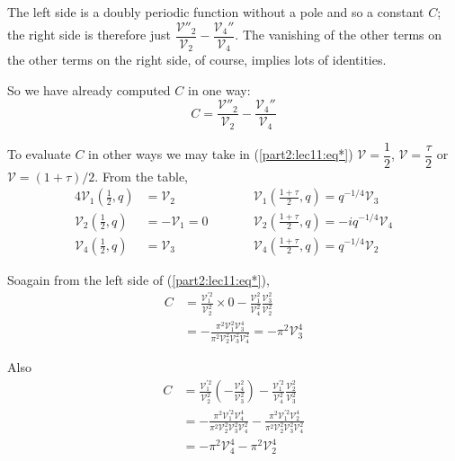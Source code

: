 The left side is a doubly periodic function without a pole and so a
constant $C$; the right side is therefore just
$\dfrac{\mathscr{V}''_2}{\mathscr{V}_2}-
\dfrac{\mathscr{V}_4''}{\mathscr{V}_4}$. The vanishing of the other
terms on the other terms on the right side, of course, implies lots of
identities. 

So we have already computed $C$ in one way:
$$
C=\dfrac{\mathscr{V}''_2}{\mathscr{V}_2}-
\dfrac{\mathscr{V}_4''}{\mathscr{V}_4}
$$
 
To evaluate $C$ in other ways we may take in (\ref{part2:lec11:eq*})
$\mathscr{V}=\dfrac{1}{2}$, $\mathscr{V}=\dfrac{\tau}{2}$ or
$\mathscr{V}=(1+ \tau)/2$. From the table,
\begin{alignat*}{4}
  \mathscr{V}_1 \left(\frac{1}{2}, q\right) & = \mathscr{V}_2 &\qquad &
  \mathscr{V}_1 \left( \frac{1+\tau}{2} , q\right) = q^{-1/4}
  \mathscr{V}_3 \\
  \mathscr{V}_2 \left(\frac{1}{2}, q\right) & = -\mathscr{V}_1=0 &&
  \mathscr{V}_2 \left( \frac{1+\tau}{2} , q\right) = -iq^{-1/4}
  \mathscr{V}_4 \\
  \mathscr{V}_4 \left(\frac{1}{2}, q\right) & = \mathscr{V}_3 &&
  \mathscr{V}_4 \left( \frac{1+\tau}{2} , q\right) = q^{-1/4}
  \mathscr{V}_2 
\end{alignat*}

So\pageoriginale again from the left side of (\ref{part2:lec11:eq*}),
\begin{align*}
  C & = \frac{\mathscr{V}_1^{'2}}{\mathscr{V}_2^2} \times 0 -
  \frac{\mathscr{V}_1^2}{\mathscr{V}_4^2}
  \frac{\mathscr{V}_3^2}{\mathscr{V}_2^2}\\ 
  & = - \frac{\pi^2 \mathscr{V}_1^2
    \mathscr{V}_3^4}{\pi^2\mathscr{V}_2^2\mathscr{V}_3^2
    \mathscr{V}_4^2} =- \pi^2 \mathscr{V}_3^4
\end{align*}

Also
\begin{align*}
  C &= \frac{\mathscr{V}_1^{'2}}{\mathscr{V}_2^2} 
  \left( -\frac{\mathscr{V}_4^2}{\mathscr{V}_3^2}\right)-
  \frac{\mathscr{V}_1^{'2}}{\mathscr{V}_4^2}
  \frac{\mathscr{V}_2^2}{\mathscr{V}_3^2}\\
  & = -\frac{\pi^2\mathscr{V}_1^{'2}\mathscr{V}_4^4}
       {\pi^2\mathscr{V}_2^2\mathscr{V}_3^2\mathscr{V}_4^2} - 
       \frac{\pi^2\mathscr{V}_1^{'2}\mathscr{V}_2^4}
       {\pi^2\mathscr{V}_2^{2}\mathscr{V}_3^2\mathscr{V}_4^2}\\
  & = - \pi^2 \mathscr{V}^4_4 - \pi^2 \mathscr{V}_2^4
\end{align*}

